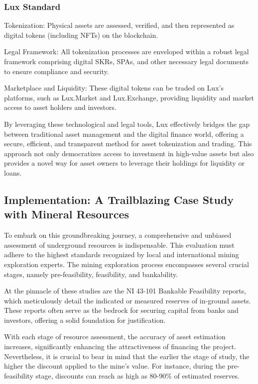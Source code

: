 \documentclass[11pt]{article}
\begin{document}
\subsubsection{Lux Standard}

Tokenization: Physical assets are assessed, verified, and then represented as digital tokens (including NFTs) on the blockchain.


Legal Framework: All tokenization processes are enveloped within a robust legal framework comprising digital SKRs, SPAs, and other necessary legal documents to ensure compliance and security.


Marketplace and Liquidity: These digital tokens can be traded on Lux's platforms, such as Lux.Market and Lux.Exchange, providing liquidity and market access to asset holders and investors.


By leveraging these technological and legal tools, Lux effectively bridges the gap between traditional asset management and the digital finance world, offering a secure, efficient, and transparent method for asset tokenization and trading. This approach not only democratizes access to investment in high-value assets but also provides a novel way for asset owners to leverage their holdings for liquidity or loans.


\subsection{Implementation: A Trailblazing Case Study with Mineral Resources}

To embark on this groundbreaking journey, a comprehensive and unbiased assessment of underground resources is indispensable. This evaluation must adhere to the highest standards recognized by local and international mining exploration experts. The mining exploration process encompasses several crucial stages, namely pre-feasibility, feasibility, and bankability.


At the pinnacle of these studies are the NI 43-101 Bankable Feasibility reports, which meticulously detail the indicated or measured reserves of in-ground assets. These reports often serve as the bedrock for securing capital from banks and investors, offering a solid foundation for justification.


With each stage of resource assessment, the accuracy of asset estimation increases, significantly enhancing the attractiveness of financing the project. Nevertheless, it is crucial to bear in mind that the earlier the stage of study, the higher the discount applied to the mine's value. For instance, during the pre-feasibility stage, discounts can reach as high as 80-90\% of estimated reserves.
\end{document}
